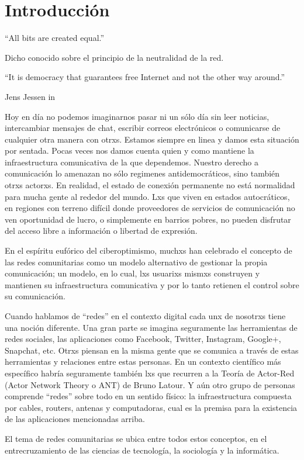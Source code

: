 \section{Introducción}

\epigraph{``All bits are created equal.''}{Dicho conocido sobre el principio de la neutralidad de la red.}
\epigraph{``It is democracy that guarantees free Internet and not the other way around.''}{Jens Jessen in~\autocite{Rieder2012}}

Hoy en día no podemos imaginarnos pasar ni un sólo día sin leer noticias, intercambiar mensajes de chat, escribir correos electrónicos o comunicarse de cualquier otra manera con otrxs.
Estamos siempre en linea y damos esta situación por sentada.
Pocas veces nos damos cuenta quien y como mantiene la infraestructura comunicativa de la que dependemos.
Nuestro derecho a comunicación lo amenazan no sólo regimenes antidemocráticos, sino también otrxs actorxs.
En realidad, el estado de conexión permanente no está normalidad para mucha gente al rededor del mundo.
Lxs que viven en estados autocráticos, en regiones con terreno difícil donde proveedores de servicios de comunicación no ven oportunidad de lucro, o simplemente en barrios pobres, no pueden disfrutar del acceso libre a información o libertad de expresión.

En el espíritu eufórico del ciberoptimismo, muchxs han celebrado el concepto de las redes comunitarias como un modelo alternativo de gestionar la propia comunicación;
un modelo, en lo cual, lxs usuarixs mismxs construyen y mantienen su infraestructura comunicativa y por lo tanto retienen el control sobre su comunicación.

Cuando hablamos de ``redes'' en el contexto digital cada unx de nosotrxs tiene una noción diferente.
Una gran parte se imagina seguramente las herramientas de redes sociales, las aplicaciones como Facebook, Twitter, Instagram, Google+, Snapchat, etc.
Otrxs piensan en la misma gente que se comunica a través de estas herramientas y relaciones entre estas personas.
En un contexto científico más específico habría seguramente también lxs que recurren a la Teoría de Actor-Red (Actor Network Theory o ANT) de Bruno Latour.
Y aún otro grupo de personas comprende ``redes'' sobre todo en un sentido físico: la infraestructura compuesta por cables, routers, antenas y computadoras, cual es la premisa para la existencia de las aplicaciones mencionadas arriba.

El tema de redes comunitarias se ubica entre todos estos conceptos, en el entrecruzamiento de las ciencias de tecnología, la sociología y la informática.

